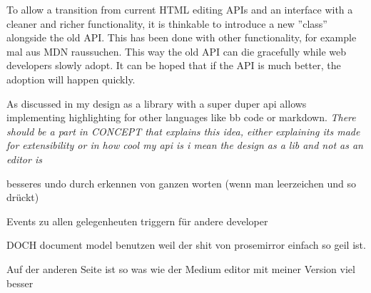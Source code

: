 To allow a transition from current HTML editing APIs and an interface with a cleaner and richer functionality, it is thinkable to introduce a new ''class'' alongside the old API. This has been done with other functionality, for example mal aus MDN raussuchen. This way the old API can die gracefully while web developers slowly adopt. It can be hoped that if the API is much better, the adoption will happen quickly.


As discussed in  my design as a library with a super duper api allows implementing highlighting for other languages like bb code or markdown. \textit{There should be a part in CONCEPT that explains this idea, either explaining its made for extensibility or in how cool my api is i mean the design as a lib and not as an editor is}


besseres undo durch erkennen von ganzen worten (wenn man leerzeichen und so drückt)

Events zu allen gelegenheuten triggern für andere developer


DOCH document model benutzen weil der shit von prosemirror einfach so geil ist.

Auf der anderen Seite ist so was wie der Medium editor mit meiner Version viel besser